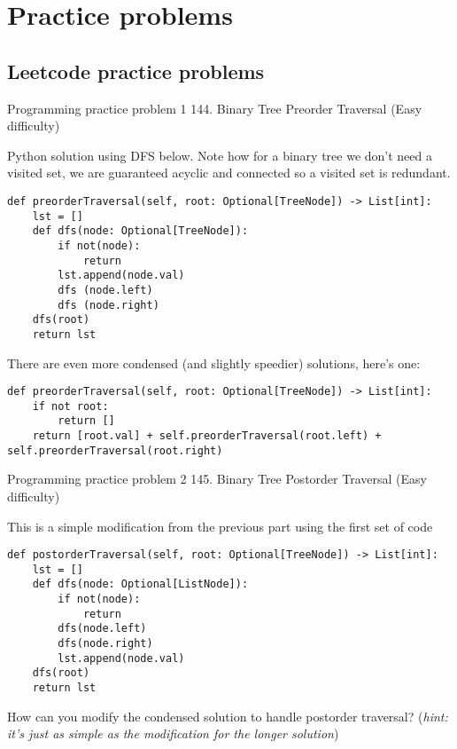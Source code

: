 \documentclass{article}
\begin{document}
\newpage
\section{Practice problems}
\subsection{Leetcode practice problems}

\begin{problem}{Programming practice problem 1}
    144. Binary Tree Preorder Traversal (Easy difficulty)
\end{problem}

Python solution using DFS below. Note how for a binary tree we don't need a visited set, we are guaranteed acyclic and connected so a visited set is redundant.

\begin{verbatim}
def preorderTraversal(self, root: Optional[TreeNode]) -> List[int]:
    lst = []
    def dfs(node: Optional[TreeNode]):
        if not(node):
            return
        lst.append(node.val)
        dfs (node.left)
        dfs (node.right)
    dfs(root)
    return lst
\end{verbatim}

There are even more condensed (and slightly speedier) solutions, here's one:

\begin{verbatim}
def preorderTraversal(self, root: Optional[TreeNode]) -> List[int]:
    if not root:
        return []
    return [root.val] + self.preorderTraversal(root.left) + self.preorderTraversal(root.right)
\end{verbatim}

\begin{problem}{Programming practice problem 2}
    145. Binary Tree Postorder Traversal (Easy difficulty)
\end{problem}

This is a simple modification from the previous part using the first set of code

\begin{verbatim}
def postorderTraversal(self, root: Optional[TreeNode]) -> List[int]:
    lst = []
    def dfs(node: Optional[ListNode]):
        if not(node):
            return
        dfs(node.left)
        dfs(node.right)
        lst.append(node.val)
    dfs(root)
    return lst
\end{verbatim}

How can you modify the condensed solution to handle postorder traversal? (\textit{hint: it's just as simple as the modification for the longer solution})
\end{document}

